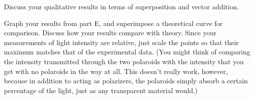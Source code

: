 \analysis

Discuss your qualitative results in terms of superposition
and vector addition.

Graph your results from part E, and superimpose a
theoretical curve for comparison. Discuss how your results
compare with theory. Since your measurements of light
intensity are relative, just scale the points so
that their maximum matches that of the experimental data. (You
might think of comparing the intensity transmitted through
the two polaroids with the intensity that you get with no
polaroids in the way at all. This doesn't really work,
however, because in addition to acting as polarizers, the
polaroids simply absorb a certain percentage of the light,
just as any transparent material would.)

